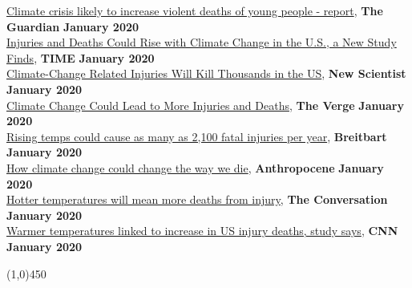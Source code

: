\href{https://www.theguardian.com/environment/2020/jan/13/climate-crisis-likely-to-increase-violent-deaths-of-young-people-report}{Climate crisis likely to increase violent deaths of young people - report}, \textbf{The Guardian} \hfill \textbf{January 2020} \\
\href{https://time.com/5764673/injuries-deaths-climate-change/}{Injuries and Deaths Could Rise with Climate Change in the U.S., a New Study Finds}, \textbf{TIME} \hfill \textbf{January 2020} \\
\href{https://www.newscientist.com/article/2229627-climate-change-related-injuries-will-kill-thousands-in-the-us/}{Climate-Change Related Injuries Will Kill Thousands in the US}, \textbf{New Scientist} \hfill \textbf{January 2020} \\
\href{https://www.theverge.com/2020/1/13/21063690/climate-change-injuries-deaths-weather-violence-drowning-accidents}{Climate Change Could Lead to More Injuries and Deaths}, \textbf{The Verge} \hfill \textbf{January 2020} \\
\href{https://www.breitbart.com/news/rising-temps-could-cause-as-many-as-2100-fatal-injuries-per-year/}{Rising temps could cause as many as 2,100 fatal injuries per year}, \textbf{Breitbart} \hfill \textbf{January 2020} \\
\href{http://www.anthropocenemagazine.org/2020/01/how-climate-change-could-change-way-we-die/}{How climate change could change the way we die}, \textbf{Anthropocene} \hfill \textbf{January 2020} \\
\href{https://theconversation.com/car-accidents-drownings-violence-hotter-temperatures-will-mean-more-deaths-from-injury-129628}{Hotter temperatures will mean more deaths from injury}, \textbf{The Conversation} \hfill \textbf{January 2020} \\
\href{https://www.cnn.com/2020/01/13/health/warm-temperatures-injury-deaths-study/index.html}{Warmer temperatures linked to increase in US injury deaths, study says}, \textbf{CNN} \hfill \textbf{January 2020}


\begin{center} \line(1,0){450} \end{center}